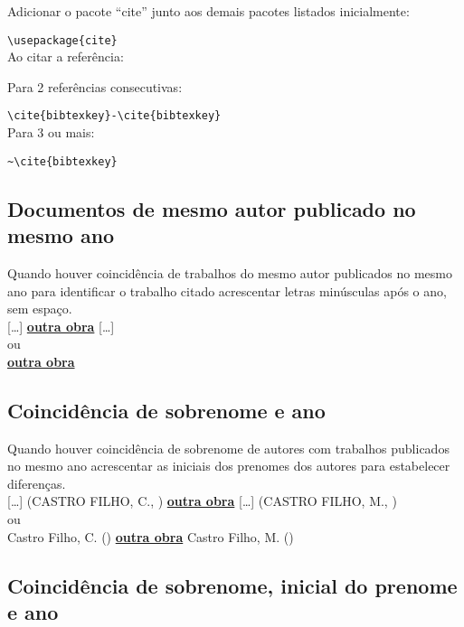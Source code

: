Adicionar o pacote “cite” junto aos demais pacotes listados inicialmente:

\verb+\usepackage{cite}+ \\

Ao citar a refer\^encia:

Para 2 refer\^encias consecutivas: 

\verb+\cite{bibtexkey}-\cite{bibtexkey}+ \\

Para 3 ou mais: 

\verb+~\cite{bibtexkey}+ \\

\subsection{Documentos de mesmo autor publicado no mesmo ano}

Quando houver coincid\^encia de trabalhos do mesmo autor publicados
no mesmo ano para identificar o trabalho citado acrescentar letras minúsculas após o ano, sem espaço.\\

[\ldots] \cite{Garcia2013b}   \textbf{\underline{outra obra}}   [\ldots] \cite{Garcia2013a} \\

ou\\

  \textbf{\underline{outra obra}}   

\subsection{Coincid\^encia de sobrenome e ano}

Quando houver coincid\^encia de sobrenome de autores com trabalhos
publicados no mesmo ano acrescentar as iniciais dos prenomes dos autores
para estabelecer diferenças.\\

[\ldots] (CASTRO FILHO, C., \citeyear{CastroC2012}) \textbf{\underline{outra obra}}   [\ldots] (CASTRO FILHO, M., \citeyear{CastroC2012}) \\

ou\\

Castro Filho, C. (\citeyear{CastroC2012}) \textbf{\underline{outra obra}}    Castro Filho, M. (\citeyear{CastroC2012})

\subsection{Coincid\^encia de sobrenome, inicial do prenome e ano}

